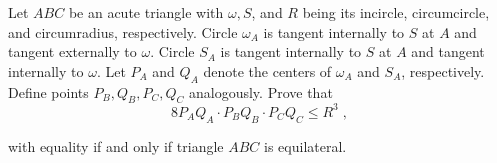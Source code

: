 Let $ABC$ be an acute triangle with $\omega,S$,  and $R$ being its incircle, circumcircle, and circumradius, respectively. Circle $\omega_{A}$ is tangent internally to $S$ at $A$ and tangent externally to $\omega$. Circle $S_{A}$ is tangent internally to $S$ at $A$ and tangent internally to $\omega$. Let $P_{A}$ and $Q_{A}$ denote the centers of $\omega_{A}$ and $S_{A}$,  respectively. Define points $P_{B}, Q_{B}, P_{C}, Q_{C}$ analogously. Prove that\[8P_{A}Q_{A}\cdot P_{B}Q_{B}\cdot P_{C}Q_{C}\leq R^{3}\; , \]

with equality if and only if triangle $ABC$ is equilateral.